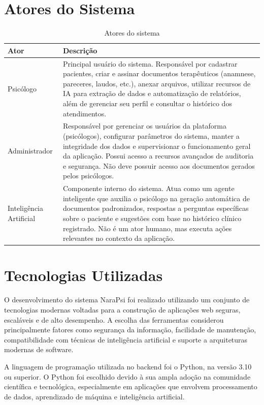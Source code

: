 \section{Atores do Sistema}

\begin{table}[H]
\centering
\caption{Atores do sistema}
\begin{tabular}{@{}p{3.4cm}p{11.2cm}@{}}
\toprule
\rowcolor[HTML]{EFEFEF} 
\textbf{Ator} & \textbf{Descrição} \\ \midrule
Psicólogo & Principal usuário do sistema. Responsável por cadastrar pacientes, criar e assinar documentos terapêuticos (anamnese, pareceres, laudos, etc.), anexar arquivos, utilizar recursos de IA para extração de dados e automatização de relatórios, além de gerenciar seu perfil e consultar o histórico dos atendimentos. \\
Administrador & Responsável por gerenciar os usuários da plataforma (psicólogos), configurar parâmetros do sistema, manter a integridade dos dados e supervisionar o funcionamento geral da aplicação. Possui acesso a recursos avançados de auditoria e segurança. Não deve possuir acesso aos documentos gerados pelos psicólogos. \\
Inteligência Artificial & Componente interno do sistema. Atua como um agente inteligente que auxilia o psicólogo na geração automática de documentos padronizados, respostas a perguntas específicas sobre o paciente e sugestões com base no histórico clínico registrado. Não é um ator humano, mas executa ações relevantes no contexto da aplicação. \\
\bottomrule
\end{tabular}
\label{tab:atores}
\end{table}

\section{Tecnologias Utilizadas}

O desenvolvimento do sistema NaraPsi foi realizado utilizando um conjunto de tecnologias modernas voltadas para a construção de aplicações web seguras, escaláveis e de alto desempenho. A escolha das ferramentas considerou principalmente fatores como segurança da informação, facilidade de manutenção, compatibilidade com técnicas de inteligência artificial e suporte a arquiteturas modernas de software.

A linguagem de programação utilizada no backend foi o Python, na versão 3.10 ou superior. O Python foi escolhido devido à sua ampla adoção na comunidade científica e tecnológica, especialmente em aplicações que envolvem processamento de dados, aprendizado de máquina e inteligência artificial.

